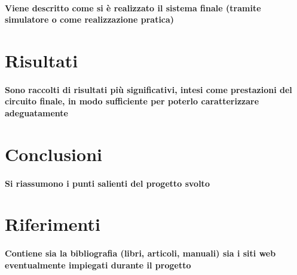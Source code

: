 \documentclass{article}
\begin{document}
\paragraph{Viene descritto come si è realizzato il sistema finale (tramite simulatore o come realizzazione pratica)}

\newpage
\section{Risultati}
\paragraph{Sono  raccolti  di  risultati  più  significativi,  intesi  come  prestazioni  del  circuito  finale,  in  modo  sufficiente per poterlo caratterizzare adeguatamente}

\newpage
\section{Conclusioni}
\paragraph{Si riassumono i punti salienti del progetto svolto}

\newpage
\section{Riferimenti}
\paragraph{Contiene  sia  la  bibliografia  (libri,  articoli,  manuali)  sia  i  siti  web  eventualmente  impiegati  durante il progetto}
\end{document}

